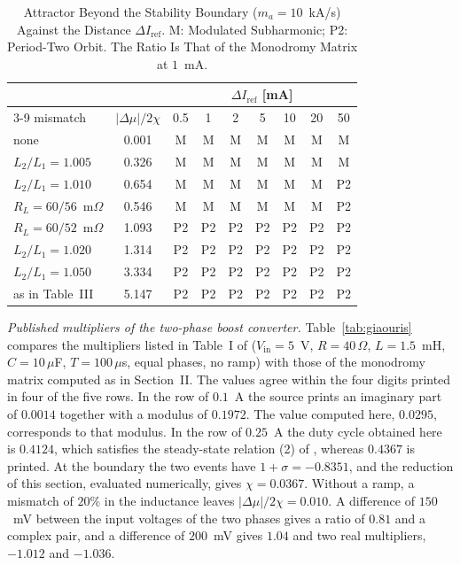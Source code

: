 \documentclass[journal]{IEEEtran}
\begin{document}
\begin{table}[!h]
\caption{Attractor Beyond the Stability Boundary ($m_a=10$~kA/s) Against
the Distance $\Delta I_{\mathrm{ref}}$. M: Modulated Subharmonic; P2:
Period-Two Orbit. The Ratio Is That of the Monodromy Matrix at $1$~mA.}
\label{tab:atractor}
\centering
\footnotesize
\setlength{\tabcolsep}{3pt}
\begin{tabular}{@{}lcccccccc@{}}
\toprule
 & & \multicolumn{7}{c}{$\Delta I_{\mathrm{ref}}$ [mA]} \\
\cmidrule(l){3-9}
mismatch & $\lvert\Delta\mu\rvert/2\chi$ & 0.5 & 1 & 2 & 5 & 10 & 20 & 50 \\
\midrule
none & 0.001 & M & M & M & M & M & M & M \\
$L_2/L_1=1.005$ & 0.326 & M & M & M & M & M & M & M \\
$L_2/L_1=1.010$ & 0.654 & M & M & M & M & M & M & P2 \\
$R_L=60/56$~m$\Omega$ & 0.546 & M & M & M & M & M & M & P2 \\
$R_L=60/52$~m$\Omega$ & 1.093 & P2 & P2 & P2 & P2 & P2 & P2 & P2 \\
$L_2/L_1=1.020$ & 1.314 & P2 & P2 & P2 & P2 & P2 & P2 & P2 \\
$L_2/L_1=1.050$ & 3.334 & P2 & P2 & P2 & P2 & P2 & P2 & P2 \\
as in Table~III & 5.147 & P2 & P2 & P2 & P2 & P2 & P2 & P2 \\
\bottomrule
\end{tabular}
\end{table}

\emph{Published multipliers of the two-phase boost converter.}
Table~\ref{tab:giaouris} compares the multipliers listed in Table~I of
\cite{giaouris2013foldings} ($V_{\mathrm{in}}=5$~V, $R=40\,\Omega$,
$L=1.5$~mH, $C=10\,\mu$F, $T=100\,\mu$s, equal phases, no ramp) with those
of the monodromy matrix computed as in Section~II. The values agree within
the four digits printed in four of the five rows. In the row of $0.1$~A the
source prints an imaginary part of $0.0014$ together with a modulus of
$0.1972$. The value computed here, $0.0295$, corresponds to that modulus. In
the row of $0.25$~A the duty cycle obtained here is $0.4124$, which
satisfies the steady-state relation (2) of \cite{giaouris2013foldings},
whereas $0.4367$ is printed. At the boundary the two events have
$1+\sigma=-0.8351$, and the reduction of this section, evaluated
numerically, gives $\chi=0.0367$. Without a ramp, a mismatch of $20\%$ in
the inductance leaves $\lvert\Delta\mu\rvert/2\chi=0.010$. A difference of
$150$~mV between the input voltages of the two phases gives a ratio of
$0.81$ and a complex pair, and a difference of $200$~mV gives $1.04$ and two
real multipliers, $-1.012$ and $-1.036$.
\end{document}
